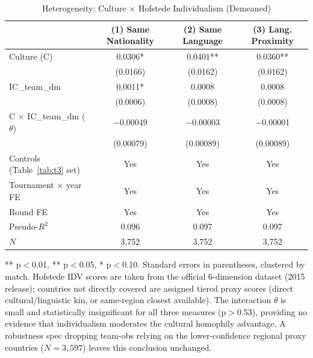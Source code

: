 \documentclass[10pt]{article}
\begin{document}
\begin{table}[htbp]
\color{blue}
\centering
\caption{Heterogeneity: Culture $\times$ Hofstede Individualism (Demeaned) \label{tab:ta4}}
\begin{threeparttable}
\begin{tabular}{lccc}
\toprule
 & (1) Same Nationality & (2) Same Language & (3) Lang. Proximity \\
\midrule
Culture (C) & 0.0306* & 0.0401** & 0.0360** \\
 & (0.0166) & (0.0162) & (0.0162) \\
IC\_team\_dm & 0.0011* & 0.0008 & 0.0008 \\
 & (0.0006) & (0.0008) & (0.0008) \\
C $\times$ IC\_team\_dm ($\theta$) & $-$0.00049 & $-$0.00003 & $-$0.00001 \\
 & (0.00079) & (0.00089) & (0.00089) \\
\midrule
Controls (Table~\ref{tab:t3} set) & Yes & Yes & Yes \\
Tournament $\times$ year FE & Yes & Yes & Yes \\
Round FE & Yes & Yes & Yes \\
Pseudo-$R^2$ & 0.096 & 0.097 & 0.097 \\
$N$ & 3,752 & 3,752 & 3,752 \\
\bottomrule
\end{tabular}
\begin{tablenotes}
\small
\item *** p$<$0.01, ** p$<$0.05, * p$<$0.10. Standard errors in parentheses, clustered by match. Hofstede IDV scores are taken from the official 6-dimension dataset (2015 release); countries not directly covered are assigned tiered proxy scores (direct cultural/linguistic kin, or same-region closest available). The interaction $\theta$ is small and statistically insignificant for all three measures (p$>$0.53), providing no evidence that individualism moderates the cultural homophily advantage. A robustness spec dropping team-obs relying on the lower-confidence regional proxy countries ($N=3{,}597$) leaves this conclusion unchanged.
\end{tablenotes}
\end{threeparttable}
\end{table}
\FloatBarrier
\end{document}
